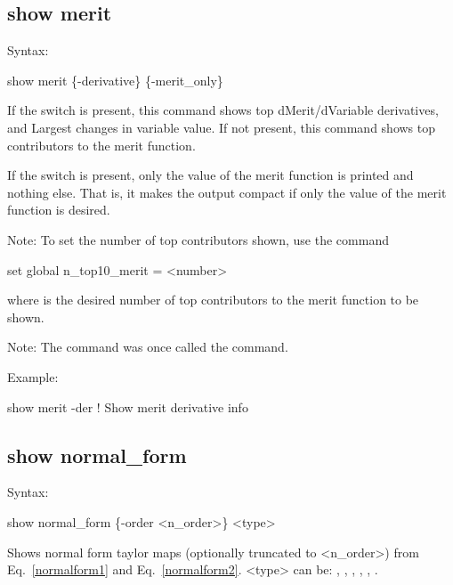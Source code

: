 {{{{{%

\subsection{show merit}
\label{s:show.merit}

Syntax:
\begin{example}
  show merit \{-derivative\} \{-merit_only\}
\end{example}

If the  switch is present, this command shows top dMerit/dVariable
derivatives, and Largest changes in variable value.  If not present, this command shows
top contributors to the merit function.

If the  switch is present, only the value of the merit function is printed
and nothing else. That is, it makes the output compact if only the value of the merit function
is desired.

Note: To set the number of top contributors shown, use the command 
\begin{example}
  set global n_top10_merit = <number>
\end{example}
where  is the desired number of top contributors to the merit function to be shown.

Note: The  command was once called the  command.

Example:
\begin{example}
  show merit -der     ! Show merit derivative info
\end{example}


\subsection{show normal_form}
\label{s:show.normal}

Syntax:
\begin{example}
  show normal_form \{-order <n_order>\} <type>
\end{example}


Shows normal form taylor maps (optionally truncated to <n\_order>) from Eq.~\ref{normalform1}
 and Eq.~\ref{normalform2}. <type> can be: , , , , , .


}}}}}
